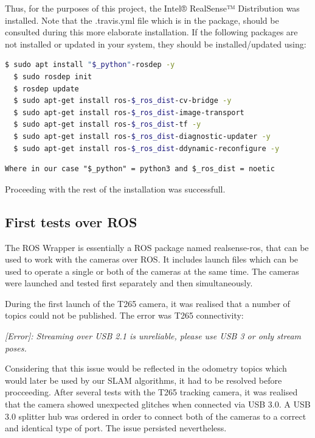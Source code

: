 \documentclass{article}
\begin{document}
Thus, for the purposes of this project, the  Intel® RealSense™ Distribution was installed. Note that the .travis.yml file which is in the package, should be consulted during this more elaborate installation. If the following packages are not installed or updated in your system, they should be installed/updated using:

\begin{lstlisting}[language=bash]
  $ sudo apt install "$_python"-rosdep -y
  $ sudo rosdep init
  $ rosdep update
  $ sudo apt-get install ros-$_ros_dist-cv-bridge -y
  $ sudo apt-get install ros-$_ros_dist-image-transport
  $ sudo apt-get install ros-$_ros_dist-tf -y
  $ sudo apt-get install ros-$_ros_dist-diagnostic-updater -y
  $ sudo apt-get install ros-$_ros_dist-ddynamic-reconfigure -y

\end{lstlisting}

\begin{verbatim}
Where in our case "$_python" = python3 and $_ros_dist = noetic
\end{verbatim}

Proceeding with the rest of the installation was successfull.

\subsection{First tests over ROS}

The ROS Wrapper is essentially a ROS package named realsense-ros, that can be used to work with the cameras over ROS. It includes launch files which can be used to operate a single or both of the cameras at the same time. The cameras were launched and tested first separately and then simultaneously.

During the first launch of the T265 camera, it was realised that a number of topics could not be published. The error was T265 connectivity:

\textit{[Error]: Streaming over USB 2.1 is unreliable, please use USB 3 or only stream poses.}

Considering that this issue would be reflected in the odometry topics which would later be used by our SLAM algorithms, it had to be resolved before procceeding. After several tests with the T265 tracking camera, it was realised that the camera showed unexpected glitches when connected via USB 3.0. A USB 3.0 splitter hub was ordered in order to connect both of the cameras to a correct and identical type of port. The issue persisted nevertheless. 
\end{document}

